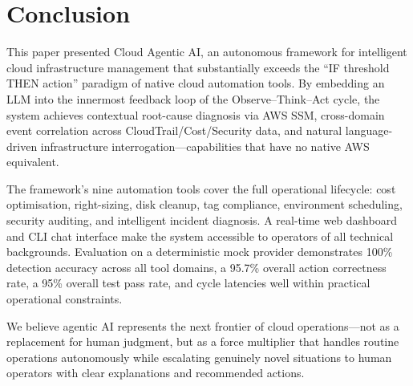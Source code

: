 \documentclass{ieeeaccess}
\begin{document}
\section{Conclusion}
\label{sec:conclusion}

This paper presented Cloud Agentic AI, an autonomous framework for intelligent
cloud infrastructure management that substantially exceeds the
``IF threshold THEN action'' paradigm of native cloud automation tools. By
embedding an LLM into the innermost feedback loop of the Observe--Think--Act
cycle, the system achieves contextual root-cause diagnosis via AWS SSM,
cross-domain event correlation across CloudTrail/Cost/Security data, and
natural language-driven infrastructure interrogation---capabilities that have
no native AWS equivalent.

The framework's nine automation tools cover the full operational lifecycle:
cost optimisation, right-sizing, disk cleanup, tag compliance, environment
scheduling, security auditing, and intelligent incident diagnosis. A real-time
web dashboard and CLI chat interface make the system accessible to operators
of all technical backgrounds. Evaluation on a deterministic mock provider
demonstrates 100\% detection accuracy across all tool domains, a 95.7\%
overall action correctness rate, a 95\% overall test pass rate, and cycle
latencies well within practical operational constraints.

We believe agentic AI represents the next frontier of cloud operations---not
as a replacement for human judgment, but as a force multiplier that handles
routine operations autonomously while escalating genuinely novel situations to
human operators with clear explanations and recommended actions.
\end{document}
